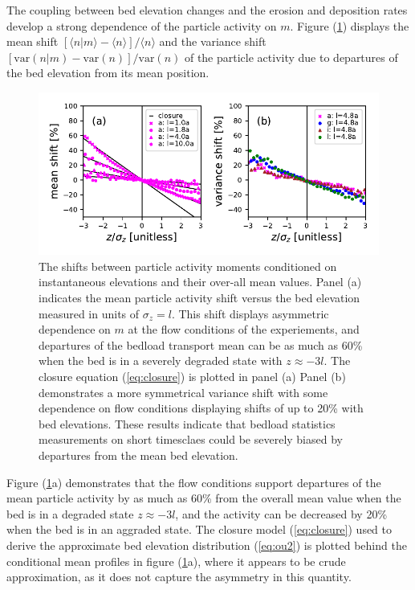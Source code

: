 \documentclass[draft]{agujournal2018}
\begin{document}
The coupling between bed elevation changes and the erosion and deposition rates develop a strong dependence of the particle activity on $m$. Figure (\ref{fig:condmoms}) displays the mean shift $[\langle n |m \rangle - \langle n \rangle]/\langle n \rangle $ and the variance shift  $[\text{var}(n|m) - \text{var}(n)]/\text{var}(n)$ of the particle activity due to departures of the bed elevation from its mean position.
\begin{figure}[!ht]
	\includegraphics[width=\linewidth,keepaspectratio]{momentsuppression.pdf}
	\caption{The shifts between particle activity moments conditioned on instantaneous elevations and their over-all mean values. Panel (a) indicates the mean particle activity shift versus the bed elevation measured in units of $\sigma_z=l$. This shift displays asymmetric dependence on $m$ at the flow conditions of the \citet{Ancey2008} experiements, and departures of the bedload transport mean can be as much as 60\% when the bed is in a severely degraded state with $z\approx -3l$. The closure equation (\ref{eq:closure}) is plotted in panel (a) Panel (b) demonstrates a more symmetrical variance shift with some dependence on flow conditions displaying shifts of up to 20\% with bed elevations. These results indicate that bedload statistics measurements on short timesclaes could be severely biased by departures from the mean bed elevation.}
	\label{fig:condmoms}
\end{figure}
Figure (\ref{fig:condmoms}a) demonstrates that the \citet{Ancey2008} flow conditions support departures of the mean particle activity by as much as 60\% from the overall mean value when the bed is in a degraded state $z\approx -3l$, and the activity can be decreased by 20\% when the bed is in an aggraded state.
The closure model (\ref{eq:closure}) used to derive the approximate bed elevation distribution (\ref{eq:ou2}) is plotted behind the conditional mean profiles in figure (\ref{fig:condmoms}a), where it appears to be crude approximation, as it does not capture the asymmetry in this quantity.
\end{document}
